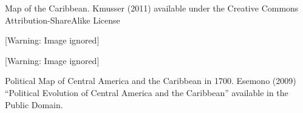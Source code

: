 \begin{styleStandard}
Map of the Caribbean. Kmusser (2011) available under the Creative Commons Attribution-ShareAlike License
\end{styleStandard}


\begin{center}
 [Warning: Image ignored] %

\end{center}
\begin{styleStandard}\bfseries

\end{styleStandard}


\begin{center}
 [Warning: Image ignored] %

\end{center}
\begin{styleStandard}
\textstylelanguage{ }Political Map of Central America and the Caribbean in 1700. Esemono (2009) “Political Evolution of Central America and the Caribbean” available in the Public Domain.
\end{styleStandard}


